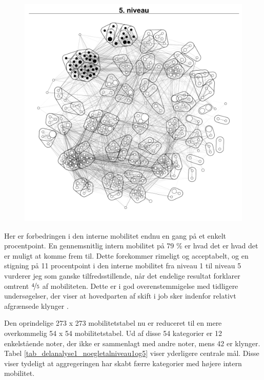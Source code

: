 \begin{figure}[H]
\begin{centering}
  \includegraphics[width=10 cm]{fig/netvaerkskort/kort_seg_proces5.pdf}
  \label{fig_delanalyse1_kort_seg_proces5}
  \caption{}
\end{centering}
\end{figure}

Her er forbedringen i den interne mobilitet endnu en gang på et enkelt procentpoint. En gennemsnitlig intern mobilitet på 79 \% er hvad det er hvad det er muligt at komme frem til. Dette forekommer rimeligt og acceptabelt, og en stigning på 11 procentpoint i den interne mobilitet fra niveau 1 til niveau 5 vurderer jeg som ganske tilfredsstillende, når det endelige resultat forklarer omtrent $\nicefrac{4}{5}$ af mobiliteten. Dette er i god overenstemmigelse med tidligere undersøgelser, der viser at hovedparten af skift i job sker indenfor relativt afgrænsede klynger \parencite[124]{BojeToft1989}. 

Den oprindelige 273 x 273 mobilitetstabel nu er reduceret til en mere overkommelig 54 x 54 mobilitetstabel. Ud af disse 54 kategorier er 12 enkelstående noter, der ikke er sammenlagt med andre noter, mens 42 er klynger. Tabel \ref{tab_delanalyse1_noegletalniveau1og5} viser yderligere centrale mål. Disse viser tydeligt at aggregeringen har skabt færre kategorier med højere intern mobilitet.



